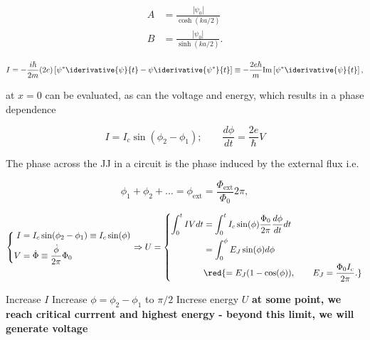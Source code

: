    \begin{align}
     A &= \frac{\left|\psi_0\right|}{\cosh(ka/2)}\\
     B &= \frac{\left|\psi_0\right|}{\sinh(ka/2)}.
   \end{align}
   
   
   \begin{equation}
     I = -\frac{i\hbar}{2m}(2e)\left[\psi^*\iderivative{\psi}{t}-\psi\iderivative{\psi^*}{t}\right] \equiv -\frac{2e\hbar}{m}\text{Im}\left[\psi^*\iderivative{\psi}{t}\right],
   \end{equation}
   
   \noindent at  $x=0$ can be  evaluated, as can  the voltage and  energy, which results  in a
   phase dependence
   
   \begin{equation}
     \label{l2-dcac}
     I = I_c\sin(\phi_2-\phi_1); \qquad \frac{d\phi}{dt} = \frac{2e}{\hbar}V
   \end{equation}
   
   The phase across the JJ in a circuit is the phase induced by the external flux i.e.
   
   \begin{equation}
     \label{eqn:l2-phasesum}
     \phi_1+\phi_2+\ldots = \phi_\text{ext} = \frac{\Phi_\text{ext}}{\Phi_0}2\pi,
   \end{equation}
   
   \begin{equation}
     \left\lbrace\begin{aligned}
         I &= I_c\sin(\phi_2-\phi_1)\equiv I_c\sin(\phi)\\
         V&=\dot{\Phi} \equiv \frac{\dot{\phi}}{2\pi}\Phi_0
       \end{aligned}\right. \Rightarrow U = \left\lbrace\begin{aligned}
         \int_{0}^{t}IV dt & = \int_{0}^{t}I_c\sin(\phi)\frac{\Phi_0}{2\pi}\frac{d\phi}{dt}dt\\
         & = \int_{0}^{\phi} E_J\sin(\phi)d\phi\\
         & \red{= E_J(1-\cos(\phi)),\qquad E_J = \frac{\Phi_0I_c}{2\pi}.}
       \end{aligned}\right.
     \label{l2-JJEnergy}
   \end{equation} 
   
  \begin{center}
    Increase $ I $ \ra Increase $ \phi = \phi_2-\phi_1 $ to $ \pi/2 $ \ra Increse energy $ U $
    \ra \textbf{at  some point, we  reach critical currrent and  highest energy -  beyond this
      limit, we will generate voltage} 
  \end{center}
   
